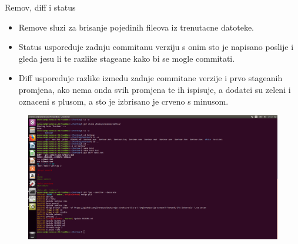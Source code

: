 \documentclass[]{beamer}
\begin{document}
\begin{frame}{Remov, diff i status}
	\begin{itemize}
	\item Remove sluzi za brisanje pojedinih fileova iz trenutacne datoteke.
	\item Status usporeduje zadnju commitanu verziju s onim sto je napisano poslije i gleda jesu li te razlike stageane kako bi se mogle commitati.
	\item Diff usporeduje razlike izmedu zadnje commitane verzije i prvo stageanih promjena, ako nema onda svih promjena te ih ispisuje, a dodatci su zeleni i oznaceni s plusom, a sto je izbrisano je crveno s minusom.
	\end{itemize}
\end{frame}
\begin{frame}
\begin{figure}
\includegraphics[width=1\textwidth]{./slike/c.png}
\end{figure}
\end{frame}
\end{document}
